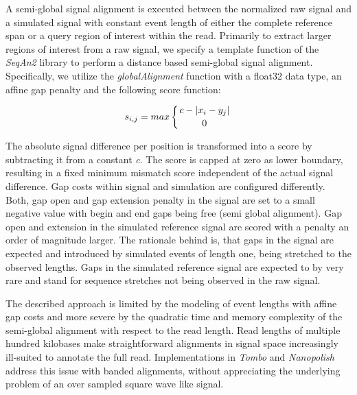 A semi-global signal alignment is executed between the normalized raw signal and a simulated signal with constant event length of either the complete reference span or a query region of interest within the read. Primarily to extract larger regions of interest from a raw signal, we specify a template function of the \textit{SeqAn2} \cite{Reinert2017} library to perform a distance based semi-global signal alignment. Specifically, we utilize the \textit{globalAlignment} function with a float32 data type, an affine gap penalty and the following score function:

\begin{equation}
s_{i,j} = max \left\lbrace c - \left| x_{i} - y_{j} \right| \atop 0 \right.
\end{equation}

The absolute signal difference per position is transformed into a score by subtracting it from a constant \textit{c}. The score is capped at zero as lower boundary, resulting in a fixed minimum mismatch score independent of the actual signal difference.
Gap costs within signal and simulation are configured differently. 
Both, gap open and gap extension penalty in the signal are set to a small negative value with begin and end gaps being free (semi global alignment). Gap open and extension in the simulated reference signal are scored with a penalty an order of magnitude larger. 
The rationale behind is, that gaps in the signal are expected and introduced by simulated events of length one, being stretched to the observed lengths. Gaps in the simulated reference signal are expected to by very rare and stand for sequence stretches not being observed in the raw signal.

The described approach is limited by the modeling of event lengths with affine gap costs and more severe by the quadratic time and memory complexity of the semi-global alignment with respect to the read length. Read lengths of multiple hundred kilobases make straightforward alignments in signal space increasingly ill-suited to annotate the full read. Implementations in \textit{Tombo} and \textit{Nanopolish} \cite{Simpson2017, Gamaarachchi2020} address this issue with banded alignments, without appreciating the underlying problem of an over sampled square wave like signal.

